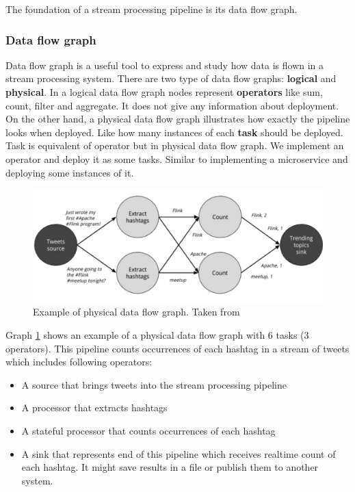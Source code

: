 \documentclass[a4]{report}
\begin{document}
    The foundation of a stream processing pipeline is its data flow graph.

    \subsubsection{Data flow graph}
    Data flow graph is a useful tool to express and study how data is flown in a stream processing system.
    There are two type of data flow graphs: \textbf{logical} and \textbf{physical}.
    In a logical data flow graph nodes represent \textbf{operators} like sum, count, filter and aggregate.
    It does not give any information about deployment.
    On the other hand, a physical data flow graph illustrates how exactly the pipeline looks when deployed.
    Like how many instances of each \textbf{task} should be deployed.
    Task is equivalent of operator but in physical data flow graph.
    We implement an operator and deploy it as some tasks.
    Similar to implementing a microservice and deploying some instances of it.

    \begin{figure}[ht]
        \caption{Example of physical data flow graph. Taken from \cite{flink}}
        \label{physical-data-flow-graph-example}
        \includegraphics[scale=0.4]{images/physical-data-flow-graph.png}
    \end{figure}

    Graph \ref{physical-data-flow-graph-example} shows an example of a physical data flow graph with 6 tasks (3
    operators).
    This pipeline counts occurrences of each hashtag in a stream of tweets which includes following operators:

    \begin{itemize}
        \item A source that brings tweets into the stream processing pipeline
        \item A processor that extracts hashtags
        \item A stateful processor that counts occurrences of each hashtag
        \item A sink that represents end of this pipeline which receives realtime count of each hashtag. It might
        save results in a file or publish them to another system.
    \end{itemize}
\end{document}
